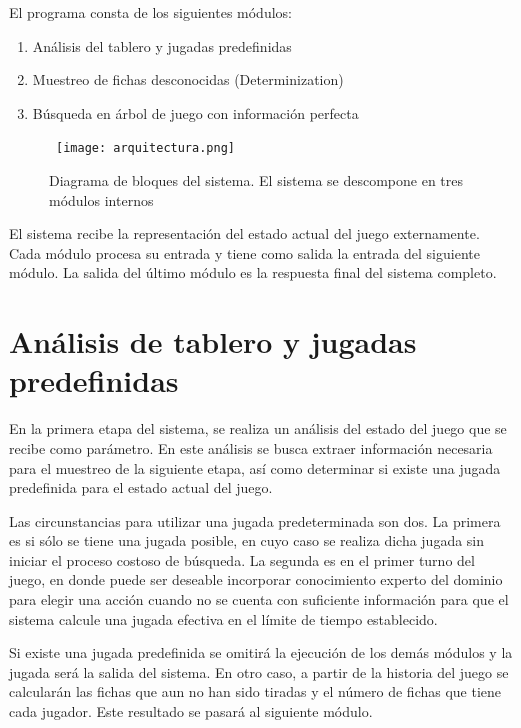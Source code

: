 El programa consta de los siguientes módulos:

\begin{enumerate}
   \item Análisis del tablero y jugadas predefinidas
   \item Muestreo de fichas desconocidas (Determinization)
   \item Búsqueda en árbol de juego con información perfecta
\end{enumerate}


\begin{figure}[ht]
\begin{center}
\hbox{\hspace{-5em} \texttt{[image: arquitectura.png]}}
\caption{Diagrama de bloques del sistema. El sistema se descompone en tres módulos internos}
\label{ARQ}
\end{center}
\end{figure}
El sistema recibe la representación del estado actual del juego externamente. Cada módulo 
procesa su entrada y tiene como salida la entrada del siguiente módulo. La salida del último 
módulo es la respuesta final del sistema completo.

\section{Análisis de tablero y jugadas predefinidas}

En la primera etapa del sistema, se realiza un análisis del estado del juego que se recibe 
como parámetro. En este análisis se busca extraer información necesaria para el muestreo 
de la siguiente etapa, así como determinar si existe una jugada predefinida para el estado 
actual del juego.

 Las circunstancias para utilizar una jugada predeterminada son dos. La primera es si sólo 
se tiene una jugada posible, en cuyo caso se realiza dicha jugada sin iniciar el proceso 
costoso de búsqueda. La segunda es en el primer turno del juego, en donde puede ser 
deseable incorporar conocimiento experto del dominio para elegir una acción cuando no se 
cuenta con suficiente información para que el sistema calcule una jugada efectiva en el 
límite de tiempo establecido.

Si existe una jugada predefinida se omitirá la ejecución de los demás módulos y la jugada 
será la salida del sistema. En otro caso, a partir de la historia del juego se calcularán las 
fichas que aun no han sido tiradas y el número de fichas que tiene cada jugador. Este 
resultado se pasará al siguiente módulo.

